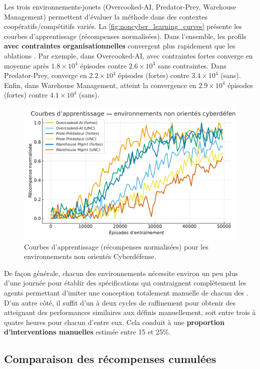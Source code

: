 Les trois environnements-jouets (Overcooked-AI, Predator-Prey, Warehouse Management) permettent d'évaluer la méthode  dans des contextes coopératifs/compétitifs variés.
La \autoref{fig:noncyber_learning_curves} présente les courbes d'apprentissage (récompenses normalisées).
Dans l'ensemble, les profils \textbf{avec contraintes organisationnelles} convergent plus rapidement que les ablations .
Par exemple, dans Overcooked-AI,  avec contraintes fortes converge en moyenne après $1.8\times 10^4$ épisodes contre $2.6\times 10^4$ sans contraintes.
Dans Predator-Prey,  converge en $2.2\times 10^4$ épisodes (fortes) contre $3.4\times 10^4$ (sans).
Enfin, dans Warehouse Management,  atteint la convergence en $2.9\times 10^4$ épisodes (fortes) contre $4.1\times 10^4$ (sans).

\begin{figure}[h!]
  \centering
  \includegraphics[width=0.75\linewidth]{figures/results_noncyber_learning.pdf}
  \caption{Courbes d'apprentissage (récompenses normalisées) pour les environnements non orientés Cyberdéfense.}
  \label{fig:noncyber_learning_curves}
\end{figure}

De façon générale, chacun des environnements nécessite environ un peu plus d'une journée pour établir des spécifications qui contraignent complètement les agents permettant d'imiter une conception totalement manuelle de chacun des . D'un autre côté, il suffit d’un à deux cycles de raffinement pour obtenir des  atteignant des performances similaires aux  définis manuellement, soit entre trois à quatre heures pour chacun d'entre eux. Cela conduit à une \textbf{proportion d'interventions manuelles} estimée entre 15 et 25\%.


\subsection*{Comparaison des récompenses cumulées}

